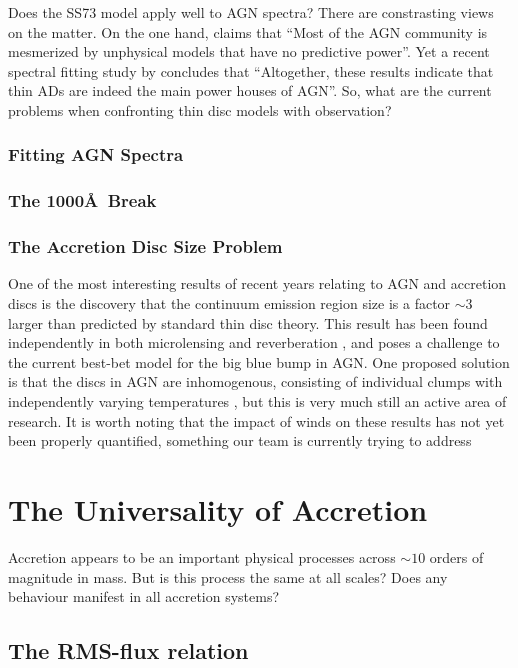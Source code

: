 Does the SS73 model apply well to AGN spectra? There are constrasting views on the matter.
On the one hand, \cite{antonucci2013} claims that ``Most of the AGN community is mesmerized by unphysical models that have no predictive power''. 
Yet a recent spectral fitting study by \cite{capellupo2015} concludes that 
``Altogether, these results indicate that thin ADs are indeed the 
main power houses of AGN''. So, what are the current problems when 
confronting thin disc models with observation? 

\subsubsection{Fitting AGN Spectra}

\subsubsection{The 1000\AA\ Break}

\subsubsection{The Accretion Disc Size Problem}

One of the most interesting results of recent years relating to AGN and accretion discs is
the discovery that the continuum emission region size is a factor $\sim3$ larger than
predicted by standard thin disc theory. This result
has been found independently in both microlensing \citep{morgan2010} 
and reverberation \citep{edelson2015}, and poses a challenge to the 
current best-bet model for the big blue bump in AGN. 
One proposed solution is that the discs in AGN are inhomogenous,
consisting of individual clumps with independently
varying temperatures \citep{dexteragol2011}, but this is very much
still an active area of research. It is worth noting that the impact
of winds on these results has not yet been properly quantified, something
our team is currently trying to address \citep{mangham}

\section{The Universality of Accretion}

Accretion appears to be an important physical processes across $\sim10$ orders
of magnitude in mass. But is this process the same at all scales? Does any 
behaviour manifest in all accretion systems? 

\subsection{The RMS-flux relation}

